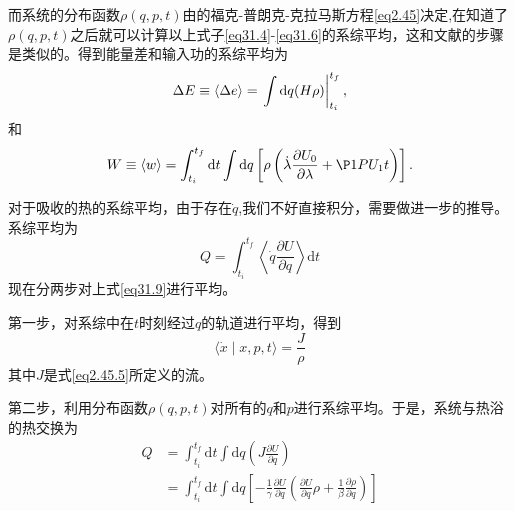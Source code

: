 而系统的分布函数$\rho (q,p,t)$由的福克-普朗克-克拉马斯方程\eqref{eq2.45}决定,在知道了$\rho (q,p,t)$之后就可以计算以上式子\eqref{eq31.4}-\eqref{eq31.6}的系综平均，这和文献\cite{Seifert2005,Shizume1995,Bizarro2011}的步骤是类似的。得到能量差和输入功的系综平均为
\begin{equation}
    \Delta E \equiv\langle\Delta e\rangle=\left.\int \mathrm{d} q (H \rho)\right|_{t_{i}} ^{t_{f}} ,
    \label{eq31.7}
\end{equation}
和
\begin{equation}
    W \equiv\langle w\rangle=\int_{t_{i}}^{t_{f}} \M{d} t \int \M{d} q \left[\rho \left( \dot{\lambda} \frac{\partial U_0}{\partial \lambda} + \P1P{U_1}{t} \right) \right].
    \label{eq31.8}
\end{equation}

对于吸收的热的系综平均，由于存在$\dot{q}$,我们不好直接积分，需要做进一步的推导。系综平均为
\begin{equation}
    Q=\int_{t_i}^{t_f}\left\langle\dot{q} \frac{\partial U}{\partial q} \right\rangle \mathrm{d} t
    \label{eq31.9}
\end{equation}
现在分两步对上式\eqref{eq31.9}进行平均。

第一步，对系综中在$t$时刻经过$q$的轨道进行平均，得到
\begin{equation}
    \langle\dot{x} \mid x, p, t\rangle=\frac{J}{\rho}
    \label{eq31.10}
\end{equation}
其中$J$是式\eqref{eq2.45.5}所定义的流。

第二步，利用分布函数$\rho(q,p,t)$对所有的$q$和$p$进行系综平均。于是，系统与热浴的热交换为
\begin{equation}
    \begin{split}
        Q&=\int_{t_i}^{t_f} \mathrm{d} t \int \mathrm{d} q \left(J \frac{\partial U}{\partial q}\right)\\
         &=\int_{t_i}^{t_f} \mathrm{d} t \int \mathrm{d} q \left[-\frac{1}{\gamma}  \frac{\partial U}{\partial q} \left(\frac{\partial U}{\partial q} \rho+\frac{1}{\beta} \frac{\partial \rho}{\partial q}\right) \right ]
    \end{split}   
    \label{eq31.11}
\end{equation}


